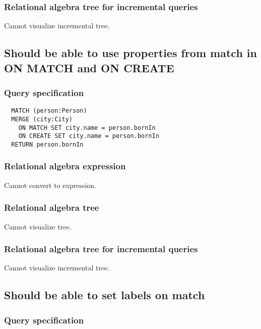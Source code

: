 \subsubsection*{Relational algebra tree for incremental queries}

Cannot visualize incremental tree.

\subsection{Should be able to use properties from match in ON MATCH and ON CREATE}

\subsubsection*{Query specification}

\begin{lstlisting}
  MATCH (person:Person)
  MERGE (city:City)
    ON MATCH SET city.name = person.bornIn
    ON CREATE SET city.name = person.bornIn
  RETURN person.bornIn
\end{lstlisting}

\subsubsection*{Relational algebra expression}

Cannot convert to expression.

\subsubsection*{Relational algebra tree}

Cannot visualize tree.

\subsubsection*{Relational algebra tree for incremental queries}

Cannot visualize incremental tree.

\subsection{Should be able to set labels on match}

\subsubsection*{Query specification}

